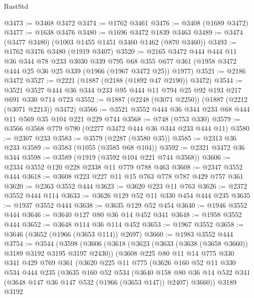 \begin{lexlean}{RustStd}
\begin{coremodule}
@3473 := @3468 @3472
@3474 := @1762 @3461
@3476 := @3408 (@1689 @3472)
@3477 := @1638 @3476
@3480 := @1696 @3472 @1839 @3463
@3489 := @3474 (@3477 @3480) (@1003 @1455 @1451 @3460 @1462 (@870 @3460))
@3493 := @1762 @3476 @3480 (@1919 @3407)
@3520 := @2165
    @3472
    @444
    @444
    @11
    @36
    @344
    @78
    @233
    @3030
    @339
    @795
    @68
    @355
    @677
    @361
    (@1958 @3472 @444 @25 @36 @25 @339 (@1966 (@1967 @3472 @25)) @1977)
@3521 := @2186 @3472
@3527 := @2221 (@1887 (@2188 (@1892 @47 @2190)) @3472)
@3544 := @3521 @3527 @444 @36 @344 @233 @95 @444 @11 @794 @25 @92 @193 @217 @691 @330 @714 @723
@3552 := @1887 (@2248 (@3071 @2250)) (@1887 (@2212 (@3071 @2213)) @3472)
@3566 := @3521 @3552 @444 @36 @344 @233 @68 @444 @11 @569 @35 @104 @221 @229 @744
@3568 := @748 (@753 @330)
@3579 := @3566 @3568 @779 @790 (@2277 @3472 @444 @36 @344 @233 @444 @11)
@3580 := @2307 @233
@3583 := @3579 (@2287 (@3580 @35))
@3585 := @2313 @36 @233
@3589 := @3583 (@1055 (@3585 @68 @104))
@3592 := @2321 @3472 @36 @344
@3598 := @3589 (@1919 (@3592 @104 @221 @744 @3568))
@3606 := @2334 @3552 @120 @228 @2338 @11 @779 @788 @463
@3608 := @2347 @3552 @444
@3618 := @3608 @223 @227 @11 @15 @763 @778 @787 @429 @757 @361
@3620 := @2363 @3552 @444
@3623 := @3620 @223 @11 @763
@3626 := @2372 @3552 @444 @114
@3633 := @3626 @129 @52 @11 @330 @454 @444 @235
@3635 := @1937 @3552 @444
@3638 := @3635 @129 @52 @454
@3640 := @1946 @3552 @444
@3646 := @3640 @127 @80 @36 @14 @452 @341
@3648 := @1958 @3552 @444
@3652 := @3648 @114 @36 @114 @452
@3653 := @1967 @3552
@3658 := @3646 (@3652 (@1966 (@3653 @114)) @2697)
@3660 := @1983 @3552 @444
@3754 := @3544
    (@3598
      (@3606
        (@3618
          (@3623 (@3633 (@3638 (@3658 @3660)) @3189 @3192 @3195 @3197 @2430))
          (@3608
            @225
            @80
            @11
            @14
            @775
            @330
            @341
            @429
            @769
            @361
            (@3620
              @225
              @11
              @775
              (@3626
                @160
                @52
                @11
                @330
                @534
                @444
                @235
                (@3635
                  @160
                  @52
                  @534
                  (@3640
                    @158
                    @80
                    @36
                    @14
                    @532
                    @341
                    (@3648 @147 @36 @147 @532 (@1966 (@3653 @147)) @2407)
                    @3660))
                @3189
                @3192

\end{coremodule}
\end{lexlean}
